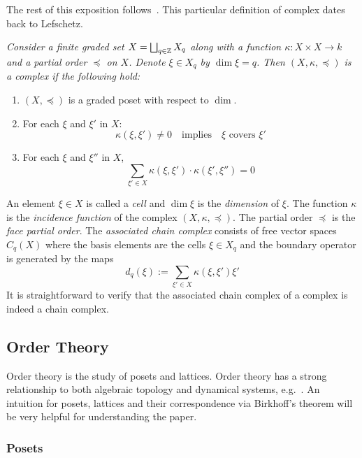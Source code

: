 The rest of this exposition follows~\cite{focm,mn}.  This particular definition of complex dates back to Lefschetz.

\begin{defn}
{\em
Consider a finite graded set $X = \bigsqcup_{q\in {\mathbb{Z}}} X_q$ along with a function $\kappa:X\times X\to k$ and a partial order $\preceq$ on $X$. Denote $\xi\in X_q$ by $\dim \xi = q$.  Then $(X,\kappa,\preceq)$ is a {\em complex} if the following hold:
\begin{enumerate}
\item $(X,\preceq)$ is a graded poset with respect to $\dim$.
\item  For each $\xi$ and $\xi'$ in $X$:
$$\kappa(\xi,\xi')\neq 0\quad\text{implies}\quad \xi \text{ covers } \xi'$$
\item For each $\xi$ and $\xi''$ in $X$,
$$\sum_{\xi'\in X} \kappa(\xi,\xi')\cdot \kappa(\xi',\xi'')=0$$
\end{enumerate}
}
\end{defn}

An element $\xi\in X$ is called a {\em cell} and $\dim \xi$ is the {\em dimension} of $\xi$.  The function $\kappa$ is the {\em incidence function} of the complex $(X,\kappa,\preceq)$.   The partial order $\preceq$ is the {\em face partial order}. The {\em associated chain complex} consists of free vector spaces $C_q(X)$ where the basis elements are the cells $\xi \in X_q$ and the boundary operator is generated by the maps $$d_q( \xi) := \sum_{\xi' \in X} \kappa(\xi, \xi')\xi'$$ It is straightforward to verify that the associated chain complex of a complex is indeed a chain complex.











\subsection{Order Theory}\label{sec:prelims:order}

Order theory is the study of posets and lattices.  Order theory has a strong relationship to both algebraic topology and dynamical systems, e.g.~\cite{salamon,lsa,lsa2}.  An intuition for posets, lattices and their correspondence via Birkhoff's theorem will be very helpful for understanding the paper.


\subsubsection{Posets}

